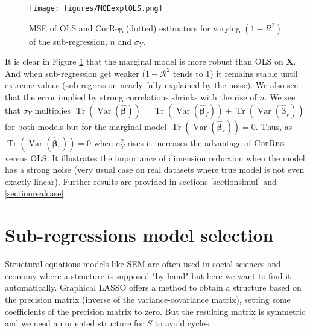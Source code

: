 \documentclass[11pt,a4paper]{article}
\begin{document}
\begin{figure}[h!]
	\texttt{[image: figures/MQEexplOLS.png]}\label{MQE1}
	\caption{MSE of OLS and CorReg (dotted) estimators for varying $(1-R^2)$ of the sub-regression, $n$ and $\sigma_Y$.}
\end{figure} 
It is clear in Figure \ref{MQE1} that the marginal model is more robust than \textsc{OLS} on $\boldsymbol{X}$. And when sub-regression get weaker ($1-\mathcal{R}^2$ tends to 1) it remains stable until extreme values (sub-regression nearly fully explained by the noise). We also see that the error implied by strong correlations shrinks with the rise of $n$. 
We see that $\sigma_Y$ multiplies $\operatorname{Tr}(\operatorname{Var}(\hat{\boldsymbol{\beta}}))=\operatorname{Tr}(\operatorname{Var}(\hat{\boldsymbol{\beta}}_{f}))+\operatorname{Tr}(\operatorname{Var}(\hat{\boldsymbol{\beta}}_{r}))$ for both models but for the marginal model $\operatorname{Tr}(\operatorname{Var}(\hat{\boldsymbol{\beta}}_{r}))=0$.
 Thus, as $\operatorname{Tr}(\operatorname{Var}(\hat{\boldsymbol{\beta}}_{r}))=0$ when $\sigma_Y^2$ rises it increases the advantage of \textsc{CorReg} versus \textsc{OLS}. It illustrates the importance of dimension reduction when the model has a strong noise (very usual case on real datasets where true model is not even exactly linear). Further results are provided in sections \ref{sectionsimul} and \ref{sectionrealcase}.

	
\section{Sub-regressions model selection}	
Structural equations models like \textsc{SEM} are often used in social sciences and economy where a structure is supposed "by hand" but here we want to find it automatically. Graphical LASSO \cite{friedman2008sparse} offers a method to obtain a structure based on the precision matrix (inverse of the variance-covariance matrix), setting some coefficients of the precision matrix to zero. But the resulting matrix is symmetric and we need an oriented structure for $S$ to avoid cycles.
\end{document}

